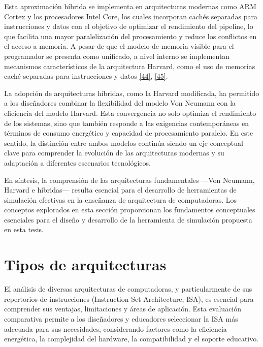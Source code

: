 \documentclass[12pt,oneside]{templates/unerthesis}
\begin{document}
Esta aproximación híbrida se implementa en arquitecturas modernas como ARM Cortex y los procesadores Intel Core, los cuales incorporan cachés separadas para instrucciones y datos con el objetivo de optimizar el rendimiento del pipeline, lo que facilita una mayor paralelización del procesamiento y reduce los conflictos en el acceso a memoria. A pesar de que el modelo de memoria visible para el programador se presenta como unificado, a nivel interno se implementan mecanismos característicos de la arquitectura Harvard, como el uso de memorias caché separadas para instrucciones y datos \protect\hyperlink{ref-arm2021architecture}{{[}44{]}}, \protect\hyperlink{ref-intel_microarchitecture_2021}{{[}45{]}}.

La adopción de arquitecturas híbridas, como la Harvard modificada, ha permitido a los diseñadores combinar la flexibilidad del modelo Von Neumann con la eficiencia del modelo Harvard. Esta convergencia no solo optimiza el rendimiento de los sistemas, sino que también responde a las exigencias contemporáneas en términos de consumo energético y capacidad de procesamiento paralelo. En este sentido, la distinción entre ambos modelos continúa siendo un eje conceptual clave para comprender la evolución de las arquitecturas modernas y su adaptación a diferentes escenarios tecnológicos.

En síntesis, la comprensión de las arquitecturas fundamentales ---Von Neumann, Harvard e híbridas--- resulta esencial para el desarrollo de herramientas de simulación efectivas en la enseñanza de arquitectura de computadoras. Los conceptos explorados en esta sección proporcionan los fundamentos conceptuales esenciales para el diseño y desarrollo de la herramienta de simulación propuesta en esta tesis.

\hypertarget{tipos-de-arquitecturas}{%
\section{Tipos de arquitecturas}\label{tipos-de-arquitecturas}}

El análisis de diversas arquitecturas de computadoras, y particularmente de sus repertorios de instrucciones (Instruction Set Architecture, ISA), es esencial para comprender sus ventajas, limitaciones y áreas de aplicación. Esta evaluación comparativa permite a los diseñadores y educadores seleccionar la ISA más adecuada para sus necesidades, considerando factores como la eficiencia energética, la complejidad del hardware, la compatibilidad y el soporte educativo.
\end{document}
